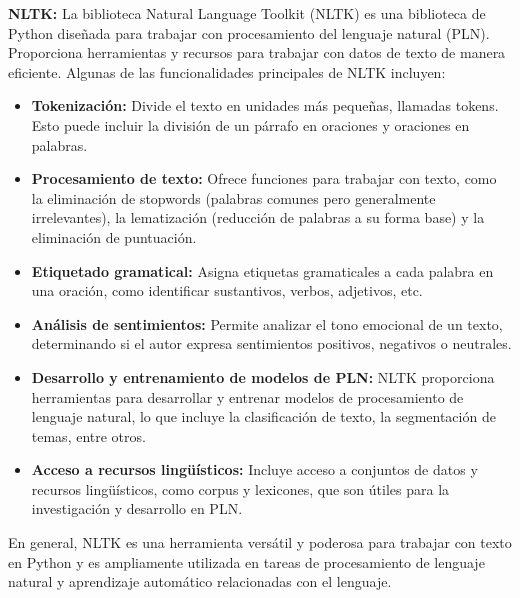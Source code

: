 \documentclass[a4paper,
               ]{jacow}
\begin{document}
\textbf{NLTK:} La biblioteca Natural Language Toolkit (NLTK) es una biblioteca de Python diseñada para trabajar con procesamiento del lenguaje natural (PLN). Proporciona herramientas y recursos para trabajar con datos de texto de manera eficiente. Algunas de las funcionalidades principales de NLTK incluyen:
\begin{itemize}
    \item \textbf{Tokenización:} Divide el texto en unidades más pequeñas, llamadas tokens. Esto puede incluir la división de un párrafo en oraciones y oraciones en palabras. 
    \item \textbf{Procesamiento de texto:} Ofrece funciones para trabajar con texto, como la eliminación de stopwords (palabras comunes pero generalmente irrelevantes), la lematización (reducción de palabras a su forma base) y la eliminación de puntuación. 
    \item \textbf{Etiquetado gramatical: } Asigna etiquetas gramaticales a cada palabra en una oración, como identificar sustantivos, verbos, adjetivos, etc. 
    \item \textbf{Análisis de sentimientos:  } Permite analizar el tono emocional de un texto, determinando si el autor expresa sentimientos positivos, negativos o neutrales. 
    \item \textbf{Desarrollo y entrenamiento de modelos de PLN:}  NLTK proporciona herramientas para desarrollar y entrenar modelos de procesamiento de lenguaje natural, lo que incluye la clasificación de texto, la segmentación de temas, entre otros. 
    \item \textbf{Acceso a recursos lingüísticos: } Incluye acceso a conjuntos de datos y recursos lingüísticos, como corpus y lexicones, que son útiles para la investigación y desarrollo en PLN. 
\end{itemize}

En general, NLTK es una herramienta versátil y poderosa para trabajar con texto en Python y es ampliamente utilizada en tareas de procesamiento de lenguaje natural y aprendizaje automático relacionadas con el lenguaje. 
\end{document}
